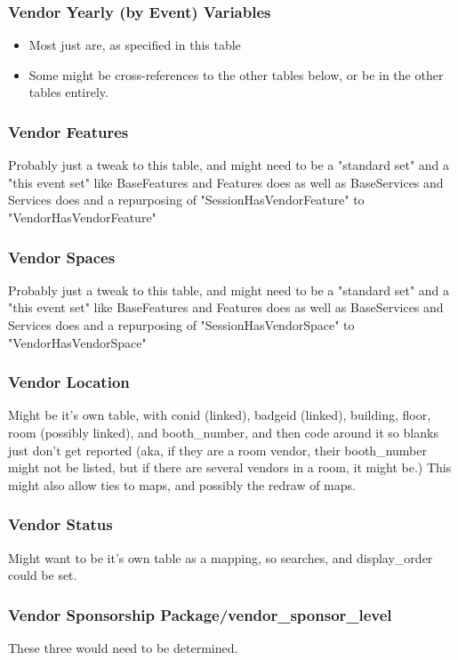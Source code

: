 \documentclass[captions=tablesignature]{scrartcl}
\begin{document}
\subsubsection{Vendor Yearly (by Event) Variables}
\label{sec-2-5-2}
\begin{itemize}
\item Most just are, as specified in this table
\item Some might be cross-references to the other tables below, or be
in the other tables entirely.
\end{itemize}

\subsubsection{Vendor Features}
\label{sec-2-5-3}
Probably just a tweak to this table, and might need to be a
"standard set" and a "this event set" like BaseFeatures and
Features does as well as BaseServices and Services does and a
repurposing of "SessionHasVendorFeature" to
"VendorHasVendorFeature"

\subsubsection{Vendor Spaces}
\label{sec-2-5-4}
Probably just a tweak to this table, and might need to be a
"standard set" and a "this event set" like BaseFeatures and
Features does as well as BaseServices and Services does and a
repurposing of "SessionHasVendorSpace" to "VendorHasVendorSpace"

\subsubsection{Vendor Location}
\label{sec-2-5-5}
Might be it's own table, with conid (linked), badgeid (linked),
building, floor, room (possibly linked), and booth\_number, and
then code around it so blanks just don't get reported (aka, if
they are a room vendor, their booth\_number might not be listed,
but if there are several vendors in a room, it might be.)  This
might also allow ties to maps, and possibly the redraw of maps.

\subsubsection{Vendor Status}
\label{sec-2-5-6}
Might want to be it's own table as a mapping, so searches, and
display\_order could be set.

\subsubsection{Vendor Sponsorship Package/vendor\_sponsor\_level}
\label{sec-2-5-7}
These three would need to be determined.
\end{document}
